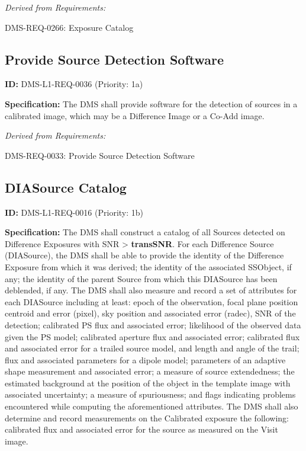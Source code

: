 \documentclass[SE,toc,lsstdraft]{lsstdoc}
\begin{document}
\emph{Derived from Requirements:}

DMS-REQ-0266:
Exposure Catalog \newline

\subsection{Provide Source Detection Software}

\label{DMS-L1-REQ-0036}
\textbf{ID:} DMS-L1-REQ-0036 (Priority: 1a)

\textbf{Specification:} The DMS shall provide software for the detection of sources in a calibrated image, which may be a Difference Image or a Co-Add image.

\emph{Derived from Requirements:}

DMS-REQ-0033:
Provide Source Detection Software \newline

\subsection{DIASource Catalog}

\label{DMS-L1-REQ-0016}
\textbf{ID:} DMS-L1-REQ-0016 (Priority: 1b)

\textbf{Specification:} The DMS shall construct a catalog of all Sources detected on Difference Exposures with SNR > \textbf{transSNR}. For each Difference Source (DIASource), the DMS shall be able to provide the identity of the Difference Exposure from which it was derived; the identity of the associated SSObject, if any; the identity of the parent Source from which this DIASource has been deblended, if any. The DMS shall also measure and record a set of attributes for each DIASource including at least: epoch of the observation, focal plane position centroid and error (pixel), sky position and associated error (radec), SNR of the detection; calibrated PS flux and associated error; likelihood of the observed data given the PS model; calibrated aperture flux and associated error; calibrated flux and associated error for a trailed source model, and length and angle of the trail; flux and associated parameters for a dipole model; parameters of an adaptive shape measurement and associated error; a measure of source extendedness; the estimated background at the position of the object in the template image with associated uncertainty; a measure of spuriousness; and flags indicating problems encountered while computing the aforementioned attributes. The DMS shall also determine and record measurements on the Calibrated exposure the following: calibrated flux and associated error for the source as measured on the Visit image.
\end{document}
